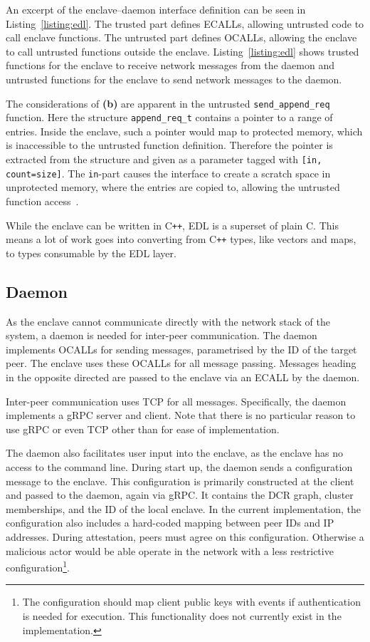 \documentclass{article}
\newcommand\cpp{C\texttt{++}\xspace}
\begin{document}
	An excerpt of the enclave--daemon interface definition can be seen in Listing~\ref{listing:edl}.
	The trusted part defines ECALLs, allowing untrusted code to call enclave functions.
	The untrusted part defines OCALLs, allowing the enclave to call untrusted functions outside the enclave.
	Listing~\ref{listing:edl} shows trusted functions for the enclave to receive network messages from the daemon and untrusted functions for the enclave to send network messages to the daemon.

	The considerations of \textbf{(b)} are apparent in the untrusted \texttt{send\_append\_req} function.
	Here the structure \texttt{append\_req\_t} contains a pointer to a range of entries.
	Inside the enclave, such a pointer would map to protected memory, which is inaccessible to the untrusted function definition.
	Therefore the pointer is extracted from the structure and given as a parameter tagged with \texttt{[in, count=size]}.
	The \texttt{in}-part causes the interface to create a scratch space in unprotected memory, where the entries are copied to, allowing the untrusted function access~\cite{intel_sgx_developer_reference}.

	While the enclave can be written in \cpp, EDL is a superset of plain C.
	This means a lot of work goes into converting from \cpp types, like vectors and maps, to types consumable by the EDL layer.

	\subsection*{Daemon}

	As the enclave cannot communicate directly with the network stack of the system, a daemon is needed for inter-peer communication.
	The daemon implements OCALLs for sending messages, parametrised by the ID of the target peer.
	The enclave uses these OCALLs for all message passing.
	Messages heading in the opposite directed are passed to the enclave via an ECALL by the daemon.

	Inter-peer communication uses TCP for all messages.
	Specifically, the daemon implements a gRPC server and client.
	Note that there is no particular reason to use gRPC or even TCP other than for ease of implementation.

	The daemon also facilitates user input into the enclave, as the enclave has no access to the command line.
	During start up, the daemon sends a configuration message to the enclave.
	This configuration is primarily constructed at the client and passed to the daemon, again via gRPC.
	It contains the DCR graph, cluster memberships, and the ID of the local enclave.
	In the current implementation, the configuration also includes a hard-coded mapping between peer IDs and IP addresses.
	During attestation, peers must agree on this configuration.
	Otherwise a malicious actor would be able operate in the network with a less restrictive configuration\footnote{The configuration should map client public keys with events if authentication is needed for execution. This functionality does not currently exist in the implementation.}.
\end{document}
